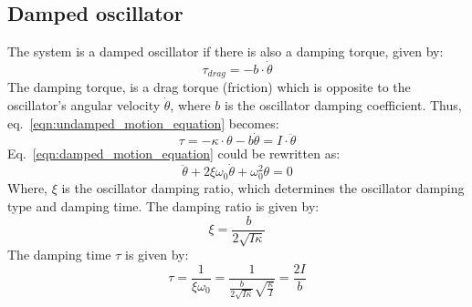 \documentclass[\main/master.tex]{subfiles}
\begin{document}
\subsection{Damped oscillator}
The system is a damped oscillator if there is also a damping torque, given by:
\begin{equation}
\tau_{drag} = -b\cdot\dot{\theta}   \label{eqn:friction_torque}
\end{equation}
The damping torque, is a drag torque (friction) which is opposite to the oscillator's angular velocity $\dot{\theta}$, where $b$ is the oscillator damping coefficient. Thus, eq.~\ref{eqn:undamped_motion_equation} becomes:
\begin{equation}
\tau = -\kappa\cdot\theta - b\dot{\theta}  = I\cdot\ddot{\theta}   \label{eqn:damped_motion_equation}
\end{equation}
Eq.~\ref{eqn:damped_motion_equation} could be rewritten as:
\begin{equation}
\ddot{\theta} + 2\xi\omega_0\dot{\theta} + \omega_0^2\theta = 0   \label{eqn:damped_motion_equation_2}
\end{equation}
Where, $\xi$ is the oscillator damping ratio, which determines the oscillator damping type and damping time. The damping ratio is given by:
\begin{equation}
\xi = \frac{b}{2\sqrt{I\kappa}} 
\label{eqn:system damping ratio}
\end{equation}
The damping time $\tau$ is given by:
\begin{equation}
\tau = \frac{1}{\xi\omega_0} = \frac{1}{\frac{b}{2\sqrt{I\kappa}}\sqrt{\frac{\kappa}{I}} }= \frac{2I}{b}  \label{eqn:damping_time}
\end{equation}
\end{document}
